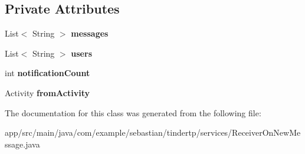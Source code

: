 \subsection*{Private Attributes}
\begin{DoxyCompactItemize}
\item 
List$<$ String $>$ {\bfseries messages}\hypertarget{classcom_1_1example_1_1sebastian_1_1tindertp_1_1services_1_1ReceiverOnNewMessage_aefb1f1979008ab68b95221dd4827a4c2}{}\label{classcom_1_1example_1_1sebastian_1_1tindertp_1_1services_1_1ReceiverOnNewMessage_aefb1f1979008ab68b95221dd4827a4c2}

\item 
List$<$ String $>$ {\bfseries users}\hypertarget{classcom_1_1example_1_1sebastian_1_1tindertp_1_1services_1_1ReceiverOnNewMessage_a721b8d37c0ba21b3fb935c0348c234e4}{}\label{classcom_1_1example_1_1sebastian_1_1tindertp_1_1services_1_1ReceiverOnNewMessage_a721b8d37c0ba21b3fb935c0348c234e4}

\item 
int {\bfseries notification\+Count}\hypertarget{classcom_1_1example_1_1sebastian_1_1tindertp_1_1services_1_1ReceiverOnNewMessage_aac0f25c20f050064f00d9574ee341759}{}\label{classcom_1_1example_1_1sebastian_1_1tindertp_1_1services_1_1ReceiverOnNewMessage_aac0f25c20f050064f00d9574ee341759}

\item 
Activity {\bfseries from\+Activity}\hypertarget{classcom_1_1example_1_1sebastian_1_1tindertp_1_1services_1_1ReceiverOnNewMessage_a9779028d5e17bc3b3025dc3230edc079}{}\label{classcom_1_1example_1_1sebastian_1_1tindertp_1_1services_1_1ReceiverOnNewMessage_a9779028d5e17bc3b3025dc3230edc079}

\end{DoxyCompactItemize}


The documentation for this class was generated from the following file\+:\begin{DoxyCompactItemize}
\item 
app/src/main/java/com/example/sebastian/tindertp/services/Receiver\+On\+New\+Message.\+java\end{DoxyCompactItemize}
